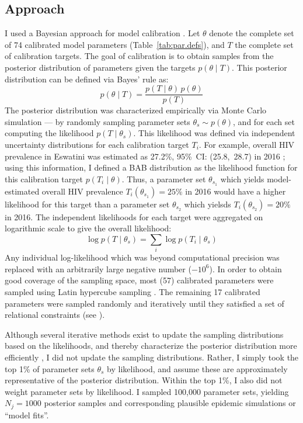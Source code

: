 \subsection{Approach}\label{model.cal.appr}
I used a Bayesian approach for model calibration \cite{Menzies2017}.
Let $\theta$ denote the complete set of 74 calibrated model parameters (Table~\ref{tab:par.defs}),
and $T$ the complete set of calibration targets.
The goal of calibration is to obtain samples from
the posterior distribution of parameters given the targets $p(\theta \mid T)$.
This posterior distribution can be defined via Bayes' rule as:
\begin{equation}
  p(\theta \mid T) = \frac{p(T \mid \theta)\,p(\theta)}{p(T)}
\end{equation}
The posterior distribution was characterized empirically via Monte Carlo simulation
--- \ie by randomly sampling parameter sets $\theta_s \sim p(\theta)$,
and for each set computing the likelihood $p(T \mid \theta_s)$.
This likelihood was defined via
independent uncertainty distributions for each calibration target $T_i$.
For example, overall HIV prevalence in Eswatini was estimated as
27.2\%, 95\%~CI: (25.8,~28.7) in 2016 \cite{SHIMS2};
using this information, I defined a BAB distribution
as the likelihood function for this calibration target $p(T_i \mid \theta)$.
Thus, a parameter set $\theta_{s_1}$ which yields
model-estimated overall HIV prevalence $T_i(\theta_{s_1}) = 25\%$ in 2016
would have a higher likelihood for this target than
a parameter set $\theta_{s_2}$ which yielsds $T_i(\theta_{s_2}) = 20\%$ in 2016.
The independent likelihoods for each target were aggregated on logarithmic scale
to give the overall likelihood:
\begin{equation}
  \log p(T \mid \theta_s) = \sum_i \log p(T_i \mid \theta_s)
\end{equation}
Any individual log-likelihood which was beyond computational precision was replaced with
an arbitrarily large negative number ($-{10}^6$).
In order to obtain good coverage of the sampling space,
most (57) calibrated parameters were sampled using Latin hypercube sampling \cite{Stein1987}.
The remaining 17 calibrated parameters were sampled randomly and iteratively
until they satisfied a set of relational constraints (see ).
\par
Although several iterative methods exist to
update the sampling distributions based on the likelihoods,
and thereby characterize the posterior distribution more efficiently \cite{Menzies2017},
I did not update the sampling distributions.
Rather, I simply took the top 1\% of parameter sets $\theta_s$ by likelihood,
and assume these are approximately representative of the posterior distribution.
Within the top 1\%, I also did not weight parameter sets by likelihood.
I sampled 100,000 parameter sets, yielding $N_j = 1000$ posterior samples and
corresponding plausible epidemic simulations or ``model fits''.
